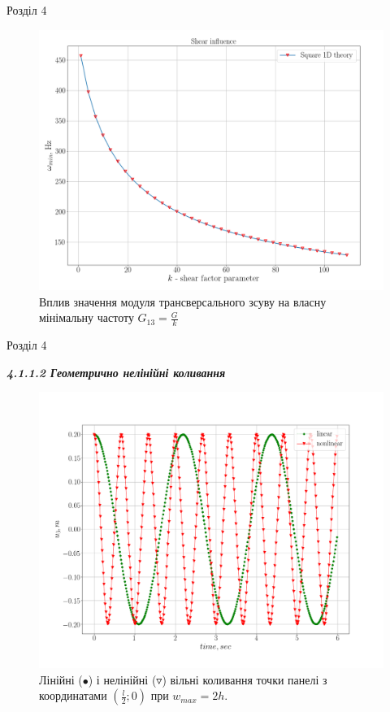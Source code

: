 \documentclass[8pt]{beamer}
\numberwithin{figure}{section}
\numberwithin{equation}{section}
\numberwithin{table}{section}
\begin{document}
\begin{frame}{Розділ 4}
\begin{figure}
	\includegraphics[scale=0.23]{pic/shear_inf.png}
		\caption{Вплив значення модуля трансверсального зсуву на власну мінімальну частоту $G_{13}=\frac{G}{k}$}
		\label{fig:shear}
\end{figure}

\end{frame}

\begin{frame}{Розділ 4}

\textbf{\textit{4.1.1.2 Геометрично нелінійні коливання}}
\begin{figure}
	\includegraphics[scale=0.2]{pic/lin_nonlin_time_w2h.png}
		\caption{Лінійні ($\bullet $) і нелінійні ($ \triangledown $) вільні коливання точки панелі з координатами $(\frac{l}{2};0)$ при $w_{max}=2h$.}
		\label{fig:nonlin_time}
\end{figure}

\end{frame}
\end{document}
